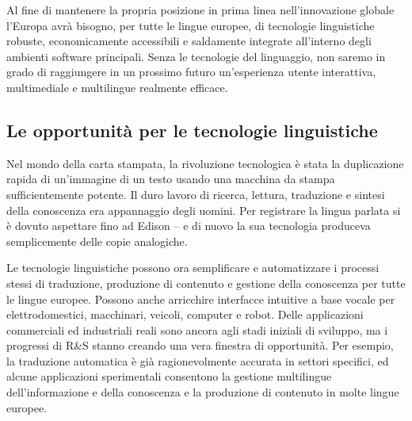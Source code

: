 \documentclass[]{../../metanetpaper}
\begin{document}
\begin{multicols}{2}

Al fine di mantenere la propria posizione in prima linea nell'innovazione
globale l'Europa avr\`{a} bisogno, per tutte le lingue europee, di tecnologie
linguistiche robuste, economicamente accessibili e saldamente integrate
all'interno degli ambienti software principali. Senza le tecnologie del
linguaggio, non saremo in grado di raggiungere in un prossimo futuro
un'esperienza utente interattiva, multimediale e multilingue realmente
efficace.



\subsection{Le opportunit\`{a} per le tecnologie linguistiche}

Nel mondo della carta stampata, la rivoluzione tecnologica \`{e} stata la
duplicazione rapida di un'immagine di un testo usando una
macchina da stampa sufficientemente potente. Il duro lavoro di ricerca,
lettura, traduzione e sintesi della conoscenza era appannaggio degli
uomini. Per registrare la lingua parlata si \`{e} dovuto aspettare fino ad
Edison – e di nuovo la sua tecnologia produceva semplicemente delle copie
analogiche.


Le tecnologie linguistiche possono ora semplificare e automatizzare i processi
stessi di traduzione, produzione di contenuto e gestione della conoscenza per
tutte le lingue europee. Possono anche arricchire interfacce intuitive a base
vocale per elettrodomestici, macchinari, veicoli, computer e
robot. Delle applicazioni commerciali ed industriali reali sono ancora agli
stadi iniziali di sviluppo, ma i progressi di R\&S stanno creando una vera
finestra di opportunit\`{a}. Per esempio, la traduzione automatica \`{e}
gi\`{a} ragionevolmente accurata in settori specifici, ed alcune applicazioni
sperimentali consentono la gestione multilingue dell'informazione e della
conoscenza e la produzione di contenuto in molte lingue europee.



\end{multicols}
\end{document}
